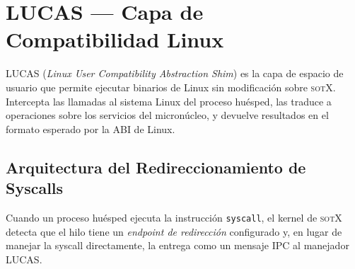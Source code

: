 \documentclass[11pt,twoside,openright]{book}
\theoremstyle{definition}
\theoremstyle{plain}
\theoremstyle{remark}
\newcommand{\sotos}{\textsc{sotX}}
\begin{document}
\chapter{LUCAS --- Capa de Compatibilidad Linux}
\label{chap:lucas}

LUCAS (\emph{Linux User Compatibility Abstraction Shim}) es la capa de
espacio de usuario que permite ejecutar binarios de Linux sin modificación sobre
\sotos{}. Intercepta las llamadas al sistema Linux del proceso huésped, las traduce
a operaciones sobre los servicios del micronúcleo, y devuelve resultados en el
formato esperado por la ABI de Linux.

\section{Arquitectura del Redireccionamiento de Syscalls}
\label{sec:lucas-arch}

Cuando un proceso huésped ejecuta la instrucción \texttt{syscall}, el kernel de
\sotos{} detecta que el hilo tiene un \emph{endpoint de redirección} configurado
y, en lugar de manejar la syscall directamente, la entrega como un mensaje IPC
al manejador LUCAS.
\end{document}
